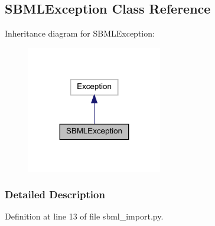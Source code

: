 \hypertarget{classamici_1_1sbml__import_1_1_s_b_m_l_exception}{}\subsection{S\+B\+M\+L\+Exception Class Reference}
\label{classamici_1_1sbml__import_1_1_s_b_m_l_exception}


Inheritance diagram for S\+B\+M\+L\+Exception\+:
\nopagebreak
\begin{figure}[H]
\begin{center}
\leavevmode
\includegraphics[width=167pt]{classamici_1_1sbml__import_1_1_s_b_m_l_exception__inherit__graph}
\end{center}
\end{figure}


\subsubsection{Detailed Description}


Definition at line 13 of file sbml\+\_\+import.\+py.

